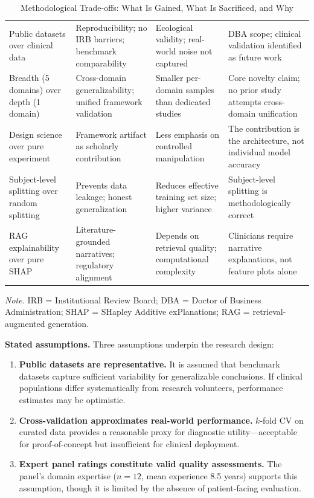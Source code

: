 \begin{table}[H]
\tablestripes
\small
\begin{tabularx}{\textwidth}{L L L L}
\toprule
{} &  &  &  \\
\midrule
Public datasets over clinical data & Reproducibility; no IRB barriers; benchmark comparability & Ecological validity; real-world noise not captured & DBA scope; clinical validation identified as future work \\
\addlinespace
Breadth (5 domains) over depth (1 domain) & Cross-domain generalizability; unified framework validation & Smaller per-domain samples than dedicated studies & Core novelty claim; no prior study attempts cross-domain unification \\
\addlinespace
Design science over pure experiment & Framework artifact as scholarly contribution & Less emphasis on controlled manipulation & The contribution is the architecture, not individual model accuracy \\
\addlinespace
Subject-level splitting over random splitting & Prevents data leakage; honest generalization & Reduces effective training set size; higher variance & Subject-level splitting is methodologically correct \\
\addlinespace
RAG explainability over pure SHAP & Literature-grounded narratives; regulatory alignment & Depends on retrieval quality; computational complexity & Clinicians require narrative explanations, not feature plots alone \\
\bottomrule
\end{tabularx}
\caption{Methodological Trade-offs: What Is Gained, What Is Sacrificed, and Why}
\label{tab:meth_tradeoffs}
\vspace{0.5em}\noindent\textit{Note.} IRB = Institutional Review Board; DBA = Doctor of Business Administration; SHAP = SHapley Additive exPlanations; RAG = retrieval-augmented generation.
\end{table}

\textbf{Stated assumptions.} Three assumptions underpin the research design:

\begin{enumerate}
    \item \textbf{Public datasets are representative.} It is assumed that benchmark datasets capture sufficient variability for generalizable conclusions. If clinical populations differ systematically from research volunteers, performance estimates may be optimistic.
    \item \textbf{Cross-validation approximates real-world performance.} $k$-fold CV on curated data provides a reasonable proxy for diagnostic utility---acceptable for proof-of-concept but insufficient for clinical deployment.
    \item \textbf{Expert panel ratings constitute valid quality assessments.} The panel's domain expertise ($n = 12$, mean experience 8.5 years) supports this assumption, though it is limited by the absence of patient-facing evaluation.
\end{enumerate}

